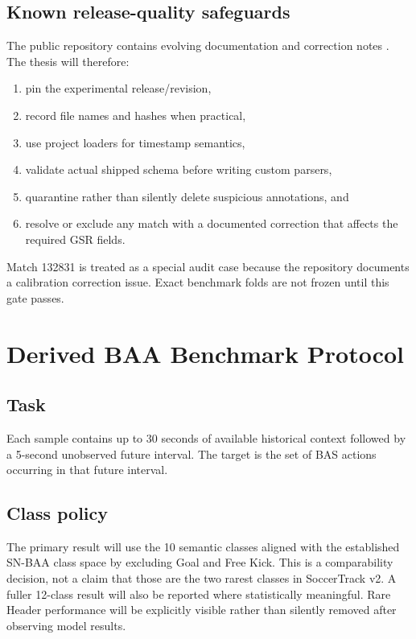 \documentclass[11pt,a4paper]{article}
\begin{document}
\subsection{Known release-quality safeguards}
The public repository contains evolving documentation and correction notes \citep{soccertrackrepo2026}. The thesis will therefore:
\begin{enumerate}
  \item pin the experimental release/revision,
  \item record file names and hashes when practical,
  \item use project loaders for timestamp semantics,
  \item validate actual shipped schema before writing custom parsers,
  \item quarantine rather than silently delete suspicious annotations, and
  \item resolve or exclude any match with a documented correction that affects the required GSR fields.
\end{enumerate}
Match 132831 is treated as a special audit case because the repository documents a calibration correction issue. Exact benchmark folds are not frozen until this gate passes.

\section{Derived BAA Benchmark Protocol}
\subsection{Task}
Each sample contains up to 30 seconds of available historical context followed by a 5-second unobserved future interval. The target is the set of BAS actions occurring in that future interval.

\subsection{Class policy}
The primary result will use the 10 semantic classes aligned with the established SN-BAA class space by excluding Goal and Free Kick. This is a comparability decision, not a claim that those are the two rarest classes in SoccerTrack v2. A fuller 12-class result will also be reported where statistically meaningful. Rare Header performance will be explicitly visible rather than silently removed after observing model results.
\end{document}
